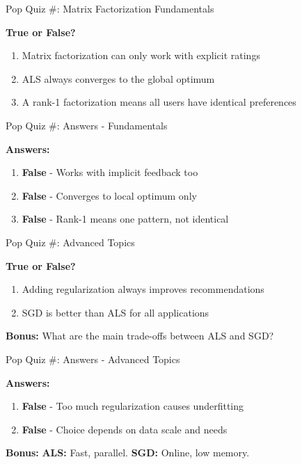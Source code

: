 \documentclass{beamer}
\begin{document}
\begin{frame}{Pop Quiz \#\thepopquiz: Matrix Factorization Fundamentals}
\begin{popquizbox}{\thepopquiz}
\textbf{True or False?}

\begin{enumerate}
    \item Matrix factorization can only work with explicit ratings
    \item ALS always converges to the global optimum
    \item A rank-1 factorization means all users have identical preferences
\end{enumerate}
\end{popquizbox}
\end{frame}

\begin{frame}{Pop Quiz \#\thepopquiz: Answers - Fundamentals}
\begin{popquizbox}{\thepopquiz}
\textbf{Answers:}

\begin{enumerate}
    \item \textbf{False} - Works with implicit feedback too
    \item \textbf{False} - Converges to local optimum only  
    \item \textbf{False} - Rank-1 means one pattern, not identical
\end{enumerate}
\end{popquizbox}
\end{frame}

\begin{frame}{Pop Quiz \#\thepopquiz: Advanced Topics}
\begin{popquizbox}{\thepopquiz}
\textbf{True or False?}

\begin{enumerate}
    \item Adding regularization always improves recommendations
    \item SGD is better than ALS for all applications
\end{enumerate}

\textbf{Bonus:} What are the main trade-offs between ALS and SGD?
\end{popquizbox}
\end{frame}

\begin{frame}{Pop Quiz \#\thepopquiz: Answers - Advanced Topics}
\begin{popquizbox}{\thepopquiz}
\textbf{Answers:}

\begin{enumerate}
    \item \textbf{False} - Too much regularization causes underfitting
    \item \textbf{False} - Choice depends on data scale and needs
\end{enumerate}

\textbf{Bonus:} \textbf{ALS:} Fast, parallel. \textbf{SGD:} Online, low memory.
\end{popquizbox}
\end{frame}
\end{document}
